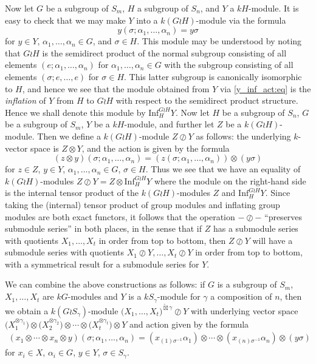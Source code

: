 \documentclass[ALCO,Unicode,published]{cedram}
\begin{document}
Now let $G$ be a subgroup of $S_m$, $H$ a subgroup of $S_n$, and $Y$ a $kH$-module. It is easy to check that we may make $Y$ into a
$k(G{\wr}H)$-module via the formula
\begin{equation}\label{y_inf_act:eq}
y(\sigma;\alpha_1,\ldots,\alpha_n) = y\sigma
\end{equation}
for $y \in Y$, $\alpha_1,\ldots,\alpha_n \in G$, and $\sigma \in H$. This module may be understood by noting that $G{\wr}H$ is the
semidirect product of the normal subgroup consisting of all elements $(e;\alpha_1,\ldots,\alpha_n)$ for $\alpha_1,\ldots,\alpha_n \in G$
with the subgroup consisting of all elements $(\sigma;e,\ldots,e)$ for $\sigma \in H$. This latter subgroup is canonically isomorphic to
$H$, and hence we see that the module obtained from $Y$ via \eqref{y_inf_act:eq} is the \textit{inflation} of $Y$ from $H$ to $G{\wr}H$
with respect to the semidirect product
structure. Hence we shall denote this module by $\mathrm{Inf}^{G{\wr}H}_H Y$.
Now let $H$ be a subgroup of $S_n$, $G$ be a subgroup of $S_m$, $Y$ be a $kH$-module, and further let $Z$ be a $k(G{\wr}H)$-module. Then
we define a $k(G{\wr}H)$-module $Z{\oslash}Y$ as follows: the underlying $k$-vector space is $Z{\otimes}Y$, and
the action is given by the formula
\[(z \otimes y)(\sigma;\alpha_1,\ldots,\alpha_n) = (z(\sigma;\alpha_1,\ldots,\alpha_n))\otimes(y\sigma)\]
for $z \in Z$, $y \in Y$, $\alpha_1,\ldots,\alpha_n \in G$, $\sigma \in H$.
Thus we see that we have an equality of $k(G{\wr}H)$-modules $Z{\oslash}Y = Z \otimes \mathrm{Inf}^{G{\wr}H}_H Y$
where the module on the right-hand side is the internal tensor product of the $k(G{\wr}H)$-modules $Z$ and $\mathrm{Inf}^{G{\wr}H}_H Y$.
Since taking the (internal) tensor product of group modules and inflating group modules are both exact functors, it follows that the
operation $- \oslash -$ ``preserves submodule series'' in both places, in the sense that if $Z$ has a submodule series with quotients
$X_1,\ldots,X_t$ in order from top to bottom, then $Z \oslash Y$ will have a submodule series with quotients $X_1 \oslash Y, \ldots,
X_t \oslash Y$ in order from top to bottom, with a symmetrical result for a submodule series for $Y$.

We can combine the above constructions as follows: if $G$ is a subgroup of $S_m$, $X_1,\ldots,X_t$ are $kG$-modules and $Y$ is a
$kS_{\gamma}$-module for $\gamma$ a composition of $n$, then we obtain a $k(G{\wr}S_{\gamma})$-module
$\bigl(X_1,\ldots,X_t\bigr)^{\widetilde\boxtimes\gamma}{\oslash}Y$
with underlying vector space
$\bigl(X^{\otimes \gamma_1}_1\bigr)\otimes\bigl(X^{\otimes \gamma_2}_2\bigr)\otimes\cdots\otimes\bigl(X^{\otimes \gamma_t}_t\bigr){\otimes}Y$
and action given by the formula
\begin{multline}\label{xs_twid_osl_y_act:eq}
	(x_1{\otimes}\cdots{\otimes}x_n{\otimes}y)(\sigma;\alpha_1,\ldots,\alpha_n) =
	(x_{(1)\sigma^{-1}}\alpha_1)\otimes\cdots\otimes(x_{(n)\sigma^{-1}}\alpha_n){\otimes}(y\sigma)
\end{multline}
for $x_i \in X$, $\alpha_i \in G$, $y \in Y$, $\sigma \in S_{\gamma}$.
\end{document}
